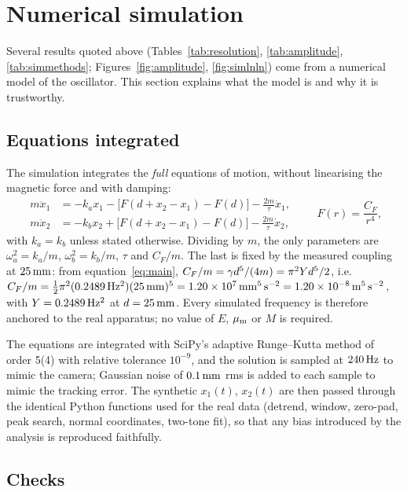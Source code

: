 \section{Numerical simulation}\label{sec:simulation}

Several results quoted above (Tables~\ref{tab:resolution}, \ref{tab:amplitude}, \ref{tab:simmethods}; Figures~\ref{fig:amplitude}, \ref{fig:simlnln}) come from a numerical model of the oscillator. This section explains what the model is and why it is trustworthy.

\subsection{Equations integrated}

The simulation integrates the \emph{full} equations of motion, without linearising the magnetic force and with damping:
\begin{equation}
\begin{aligned}
m\ddot x_1&=-k_ax_1-\big[F(d+x_2-x_1)-F(d)\big]-\frac{2m}{\tau}\dot x_1,\\
m\ddot x_2&=-k_bx_2+\big[F(d+x_2-x_1)-F(d)\big]-\frac{2m}{\tau}\dot x_2,
\end{aligned}
\qquad F(r)=\frac{C_F}{r^4},
\label{eq:fulleom}
\end{equation}
with $k_a=k_b$ unless stated otherwise. Dividing by $m$, the only parameters are $\omega_a^2=k_a/m$, $\omega_b^2=k_b/m$, $\tau$ and $C_F/m$. The last is fixed by the measured coupling at $25\,\mathrm{mm}$: from equation~\eqref{eq:main}, $C_F/m=\gamma d^5/(4m)=\pi^2Y d^5/2$, i.e.\ $C_F/m=\tfrac12\pi^2(0.2489\,\mathrm{Hz^2})(25\,\mathrm{mm})^5=1.20\times10^{7}\,\mathrm{mm^5\,s^{-2}}=1.20\times10^{-8}\,\mathrm{m^5\,s^{-2}}$, with $Y=0.2489\,\mathrm{Hz^2}$ at $d=25\,\mathrm{mm}$. Every simulated frequency is therefore anchored to the real apparatus; no value of $E$, $\mu_{\mathrm m}$ or $M$ is required.

The equations are integrated with SciPy's adaptive Runge--Kutta method of order 5(4) with relative tolerance $10^{-9}$, and the solution is sampled at $240\,\mathrm{Hz}$ to mimic the camera; Gaussian noise of $0.1\,\mathrm{mm}$ rms is added to each sample to mimic the tracking error. The synthetic $x_1(t)$, $x_2(t)$ are then passed through the identical Python functions used for the real data (detrend, window, zero-pad, peak search, normal coordinates, two-tone fit), so that any bias introduced by the analysis is reproduced faithfully.

\subsection{Checks}

